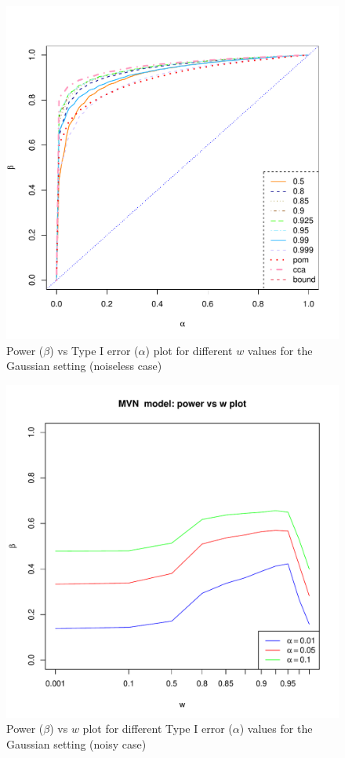 \documentclass[11pt]{article} %
\begin{document}
\begin{figure}
\includegraphics[scale=0.35]{MVN-FC-Tradeoff-OOSc0-n150.pdf}
\caption{Power ($\beta$) vs Type I error ($\alpha$) plot for different $w$ values for the Gaussian setting (noiseless case)}
\label{fig:MVN-c0-power-alpha}
\end{figure}

\begin{figure}
\includegraphics[scale=0.95]{OOS-MVN-power-w-c0-01.pdf}
\caption{Power ($\beta$) vs $w$ plot for different Type I error ($\alpha$) values for the Gaussian setting (noisy case)}
\label{fig:MVN-c001-power-w}
\end{figure}
\end{document}
